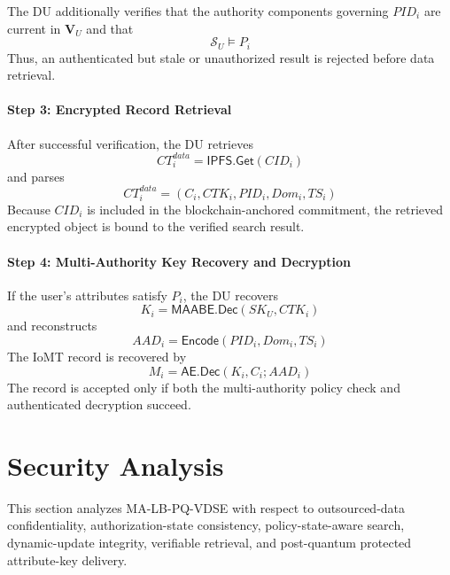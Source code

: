 \documentclass{ieeetj}
\theoremstyle{ieee-style}
\begin{document}
The DU additionally verifies that the authority components governing
$PID_i$ are current in $\mathbf{V}_U$ and that
\begin{equation}
\mathcal{S}_U\models P_i
\label{eq:retrieval-authorization}
\end{equation}
Thus, an authenticated but stale or unauthorized result is rejected
before data retrieval.

\paragraph*{Step 3: Encrypted Record Retrieval}

After successful verification, the DU retrieves
\begin{equation}
CT_i^{data}
=
\mathsf{IPFS.Get}(CID_i)
\end{equation}
and parses
\begin{equation}
CT_i^{data}
=
(C_i,CTK_i,PID_i,Dom_i,TS_i)
\end{equation}
Because $CID_i$ is included in the blockchain-anchored commitment, the
retrieved encrypted object is bound to the verified search result.

\paragraph*{Step 4: Multi-Authority Key Recovery and Decryption}

If the user's attributes satisfy $P_i$, the DU recovers
\begin{equation}
K_i=
\mathsf{MAABE.Dec}(SK_U,CTK_i)
\end{equation}
and reconstructs
\begin{equation}
AAD_i=
\mathsf{Encode}(PID_i,Dom_i,TS_i)
\end{equation}
The IoMT record is recovered by
\begin{equation}
M_i=
\mathsf{AE.Dec}(K_i,C_i;AAD_i)
\label{eq:final-decryption}
\end{equation}
The record is accepted only if both the multi-authority policy check and
authenticated decryption succeed.

\section{Security Analysis}
\label{sec:security}

This section analyzes MA-LB-PQ-VDSE with respect to outsourced-data
confidentiality, authorization-state consistency, policy-state-aware
search, dynamic-update integrity, verifiable retrieval, and
post-quantum protected attribute-key delivery.
\end{document}
